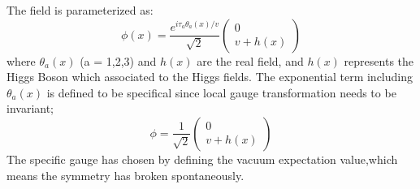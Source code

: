 
The field is parameterized as:
\begin{equation}
\phi(x)=\frac{e^{i \tau_{a} \theta_{a}(x) / v}}{\sqrt{2}}\left(\begin{array}{c}
0 \\
v+h(x)
\end{array}\right)
\end{equation}
where $\theta_{a}(x)$ (a = 1,2,3) and $h(x)$ are the real field, and  $h(x)$ represents the Higgs Boson which associated to the Higgs fields. The exponential term including $\theta_{a}(x)$ is defined to be specifical since local gauge transformation needs to be invariant;
\begin{equation}
\phi=\frac{1}{\sqrt{2}}\left(\begin{array}{c}
0 \\
v+h(x)
\end{array}\right)
\end{equation}
The specific gauge has chosen by defining the vacuum expectation value,which means the symmetry has broken spontaneously. 

